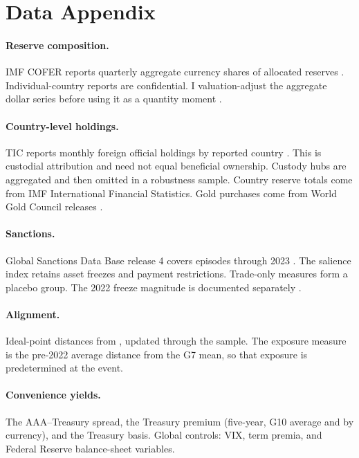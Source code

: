 \documentclass[11pt]{article}
\theoremstyle{definition}
\begin{document}
\section{Data Appendix}\label{app:data}

\paragraph{Reserve composition.} IMF COFER reports quarterly aggregate currency shares of allocated reserves \citep{IMFCOFER}. Individual-country reports are confidential. I valuation-adjust the aggregate dollar series before using it as a quantity moment \citep{ArslanalpEichengreenSimpsonBell2022}.

\paragraph{Country-level holdings.} TIC reports monthly foreign official holdings by reported country \citep{USTreasuryTIC}. This is custodial attribution and need not equal beneficial ownership. Custody hubs are aggregated and then omitted in a robustness sample. Country reserve totals come from IMF International Financial Statistics. Gold purchases come from World Gold Council releases \citep{WGC2024}.

\paragraph{Sanctions.} Global Sanctions Data Base release 4 covers episodes through 2023 \citep{GSDBRelease4}. The salience index retains asset freezes and payment restrictions. Trade-only measures form a placebo group. The 2022 freeze magnitude is documented separately \citep{BrookingsRussiaAssets2025}.

\paragraph{Alignment.} Ideal-point distances from \citet{BaileyStrezhnevVoeten2017}, updated through the sample. The exposure measure is the pre-2022 average distance from the G7 mean, so that exposure is predetermined at the event.

\paragraph{Convenience yields.} The \citet{KrishnamurthyVissingJorgensen2012} AAA--Treasury spread, the \citet{DuImSchreger2018} Treasury premium (five-year, G10 average and by currency), and the \citet{JiangKrishnamurthyLustig2021} Treasury basis. Global controls: VIX, term premia, and Federal Reserve balance-sheet variables.
\end{document}
